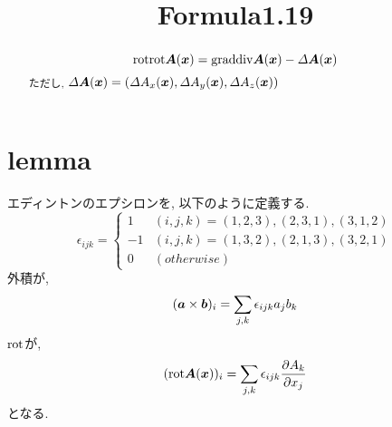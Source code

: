 \documentclass{jsarticle}
\title{Formula1.19}
\newcommand*{\mbold}[1]{\mbox{\boldmath $#1$}}
\newcommand*{\grad}{{\rm grad}}
\newcommand*{\divg}{{\rm div}}
\newcommand*{\rot}{{\rm rot}}
\begin{document}
\maketitle

\begin{abstract}
  \begin{equation}
    \rot\rot\mbold{A}(\mbold{x}) = \grad \divg \mbold{A}(\mbold{x}) - \varDelta \mbold{A}(\mbold{x})
  \end{equation}
  ただし, $\varDelta \mbold{A}(\mbold{x}) = (\varDelta A_x(\mbold{x}), \varDelta A_y(\mbold{x}),\varDelta A_z(\mbold{x}))$
\end{abstract}

\section{lemma}
エディントンのエプシロンを, 以下のように定義する. 
\begin{equation}
  \epsilon_{ijk} = 
    \begin{cases}
      1 & (i, j, k) = (1, 2, 3), (2, 3, 1), (3, 1, 2) \\
      -1 & (i, j, k) = (1, 3, 2), (2, 1, 3), (3, 2, 1) \\
      0 & (otherwise)
    \end{cases}
\end{equation}
外積が, 
\begin{equation}
  (\mbold{a} \times \mbold{b})_i = \sum_{j, k}\epsilon_{ijk}a_j b_k
\end{equation}
$\rot$が, 
\begin{equation}
  (\rot\mbold{A}(\mbold{x}))_i = \sum_{j, k}\epsilon_{ijk}\frac{\partial A_k}{\partial x_j}
\end{equation}
となる. 
\end{document}
